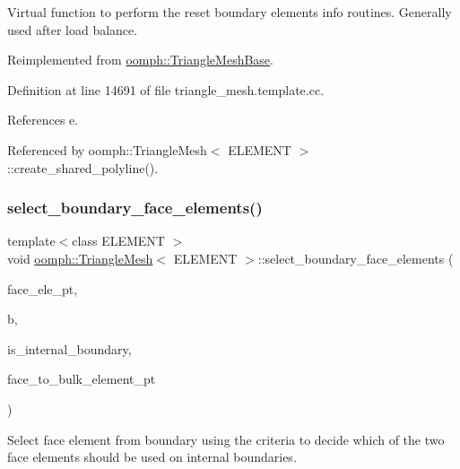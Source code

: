Virtual function to perform the reset boundary elements info routines. Generally used after load balance. 

Reimplemented from \hyperlink{classoomph_1_1TriangleMeshBase_a87ca1b2f78d61547def3245a5201689e}{oomph\+::\+Triangle\+Mesh\+Base}.



Definition at line 14691 of file triangle\+\_\+mesh.\+template.\+cc.



References e.



Referenced by oomph\+::\+Triangle\+Mesh$<$ E\+L\+E\+M\+E\+N\+T $>$\+::create\+\_\+shared\+\_\+polyline().

\mbox{\label{classoomph_1_1TriangleMesh_ac1f03c55686f172c1680f39895568ac7}} 
\subsubsection{\texorpdfstring{select\+\_\+boundary\+\_\+face\+\_\+elements()}{select\_boundary\_face\_elements()}}
{\footnotesize\ttfamily template$<$class E\+L\+E\+M\+E\+NT $>$ \\
void \hyperlink{classoomph_1_1TriangleMesh}{oomph\+::\+Triangle\+Mesh}$<$ E\+L\+E\+M\+E\+NT $>$\+::select\+\_\+boundary\+\_\+face\+\_\+elements (\begin{DoxyParamCaption}\item[{\hyperlink{classoomph_1_1Vector}{Vector}$<$ \hyperlink{classoomph_1_1FiniteElement}{Finite\+Element} $\ast$$>$ \&}]{face\+\_\+ele\+\_\+pt,  }\item[{const unsigned \&}]{b,  }\item[{bool \&}]{is\+\_\+internal\+\_\+boundary,  }\item[{std\+::map$<$ \hyperlink{classoomph_1_1FiniteElement}{Finite\+Element} $\ast$, \hyperlink{classoomph_1_1FiniteElement}{Finite\+Element} $\ast$$>$ \&}]{face\+\_\+to\+\_\+bulk\+\_\+element\+\_\+pt }\end{DoxyParamCaption})}



Select face element from boundary using the criteria to decide which of the two face elements should be used on internal boundaries. 

